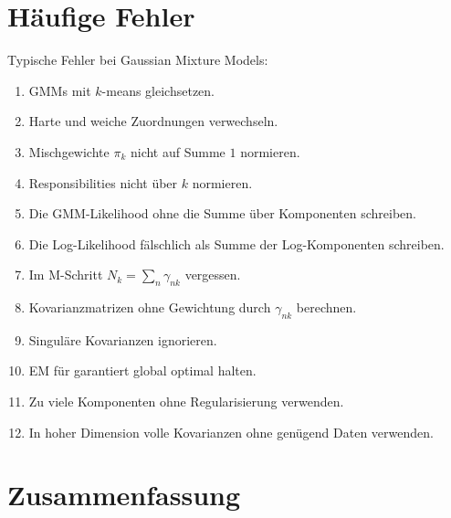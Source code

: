 \section{Häufige Fehler}

\begin{examtipbox}
Typische Fehler bei Gaussian Mixture Models:

\begin{enumerate}
    \item GMMs mit \(k\)-means gleichsetzen.
    \item Harte und weiche Zuordnungen verwechseln.
    \item Mischgewichte \(\pi_k\) nicht auf Summe \(1\) normieren.
    \item Responsibilities nicht über \(k\) normieren.
    \item Die GMM-Likelihood ohne die Summe über Komponenten schreiben.
    \item Die Log-Likelihood fälschlich als Summe der Log-Komponenten schreiben.
    \item Im M-Schritt \(N_k=\sum_n\gamma_{nk}\) vergessen.
    \item Kovarianzmatrizen ohne Gewichtung durch \(\gamma_{nk}\) berechnen.
    \item Singuläre Kovarianzen ignorieren.
    \item EM für garantiert global optimal halten.
    \item Zu viele Komponenten ohne Regularisierung verwenden.
    \item In hoher Dimension volle Kovarianzen ohne genügend Daten verwenden.
\end{enumerate}
\end{examtipbox}

\section{Zusammenfassung}

